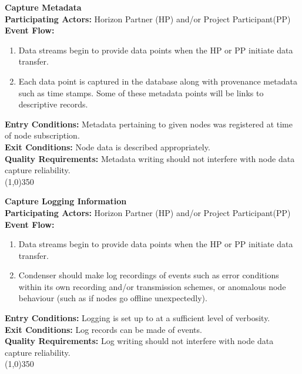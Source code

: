 		\textbf{Capture Metadata}\\	 
		\textbf{Participating Actors:} Horizon Partner (HP) and/or Project Participant(PP) \\
		\textbf{Event Flow:}
		\begin{enumerate}
\item Data streams begin to provide data points when the HP or PP initiate data transfer.
\item Each data point is captured in the database along with provenance metadata such as time stamps. Some of these metadata points will be links to descriptive records.
	    \end{enumerate}
		\textbf{Entry Conditions:} Metadata pertaining to given nodes was registered at time of node subscription.\\
		\textbf{Exit Conditions:} Node data is described appropriately.\\
		\textbf{Quality Requirements:} Metadata writing should not interfere with node data capture reliability. \\
		\line(1,0){350}	
		
		\textbf{Capture Logging Information}\\
		\textbf{Participating Actors:} Horizon Partner (HP) and/or Project Participant(PP) \\
		\textbf{Event Flow:}
		\begin{enumerate}
\item Data streams begin to provide data points when the HP or PP initiate data transfer.
\item Condenser should make log recordings of events such as error conditions within its own recording and/or transmission schemes, or anomalous node behaviour (such as if nodes go offline unexpectedly).
	    \end{enumerate}
		\textbf{Entry Conditions:} Logging is set up to at a sufficient level of verbosity.\\
		\textbf{Exit Conditions:} Log records can be made of events.\\
		\textbf{Quality Requirements:} Log writing should not interfere with node data capture reliability. \\
		\line(1,0){350}	